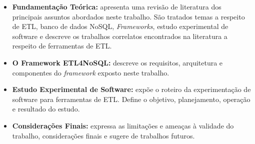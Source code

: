 \begin{itemize}
	\item \textbf{Fundamentação Teórica:} apresenta uma revisão de literatura dos principais assuntos abordados neste trabalho. São tratados temas a respeito de ETL, banco de dados NoSQL, \textit{Frameworks}, estudo experimental de software e descreve os trabalhos correlatos encontrados na literatura a respeito de ferramentas de ETL.
	
	\item \textbf{O Framework ETL4NoSQL:} descreve os requisitos, arquitetura e componentes do \textit{framework} exposto neste trabalho.
	
	\item \textbf{Estudo Experimental de Software:} expõe o roteiro da experimentação de software para ferramentas de ETL. Define o objetivo, planejamento, operação e resultado do estudo.
	
	\item \textbf{Considerações Finais:} expressa as limitações e ameaças à validade do trabalho, considerações finais e sugere de trabalhos futuros.	
	
\end{itemize}


